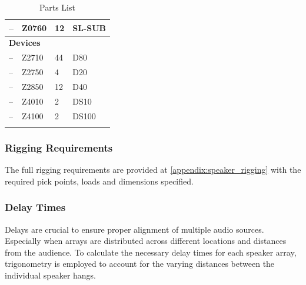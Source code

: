 \begin{longtable}[H]{|llll|}
            \multicolumn{1}{|l|}{--}              & \multicolumn{1}{l|}{Z0760}                  & \multicolumn{1}{l|}{12}             & SL-SUB                     \\ \hline
            \multicolumn{4}{|l|}{\textbf{Devices}}                                                                                                                 \\ \hline
            \multicolumn{1}{|l|}{--}              & \multicolumn{1}{l|}{Z2710}                  & \multicolumn{1}{l|}{44}             & D80                        \\ \hline
            \multicolumn{1}{|l|}{--}              & \multicolumn{1}{l|}{Z2750}                  & \multicolumn{1}{l|}{4}              & D20                        \\ \hline
            \multicolumn{1}{|l|}{--}              & \multicolumn{1}{l|}{Z2850}                  & \multicolumn{1}{l|}{12}             & D40                        \\ \hline
            \multicolumn{1}{|l|}{--}              & \multicolumn{1}{l|}{Z4010}                  & \multicolumn{1}{l|}{2}              & DS10                       \\ \hline
            \multicolumn{1}{|l|}{--}              & \multicolumn{1}{l|}{Z4100}                  & \multicolumn{1}{l|}{2}              & DS100                      \\ \hline
           
            \caption{Parts List}
            \label{tab:parts_list}
        \end{longtable}

    \subsubsection{Rigging Requirements}
        The full rigging requirements are provided at \ref{appendix:speaker_rigging} with the required pick points, loads and dimensions specified.

    \subsubsection{Delay Times}
        Delays are crucial to ensure proper alignment of multiple audio sources. Especially when arrays are distributed across different locations and distances from the audience. To calculate the necessary delay times for each speaker array, trigonometry is employed to account for the varying distances between the individual speaker hangs.


